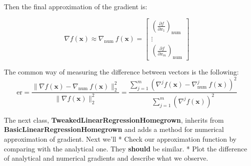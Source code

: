 \documentclass[11pt]{article}
\begin{document}
Then the final approximation of the gradient is:

\[
\nabla f(\mathbf{x}) \approx \nabla_{\text{num}\,\,} f(\mathbf{x}) = \begin{bmatrix}
\left( \frac{\partial f}{\partial x_1} \right)_{\text{num}}\\
\vdots\\
\left( \frac{\partial f}{\partial x_m} \right)_{\text{num}}
\end{bmatrix}
\]

The common way of measuring the difference between vectors is the
following: \[
\text{er} = \frac{\|\nabla f(\mathbf{x}) - \nabla_{\text{num}\,\,}f(\mathbf{x})\|_2^2}{\|\nabla f(\mathbf{x})\|_2^2} = \frac{\sum_{j=1}^{m}\left(\nabla^j f(\mathbf{x}) - \nabla^j_{\text{num}\,\,}f(\mathbf{x})\right)^2}{\sum_{j=1}^{m}\left(\nabla^j f(\mathbf{x})\right)^2}
\]

The next class, \textbf{TweakedLinearRegressionHomegrown}, inherits from
\textbf{BasicLinearRegressionHomegrown} and adds a method for numerical
approximation of gradient. Next we'll * Check our approximation function
by comparing with the analytical one. They \textbf{should} be similar. *
Plot the difference of analytical and numerical gradients and describe
what we observe.
\end{document}
